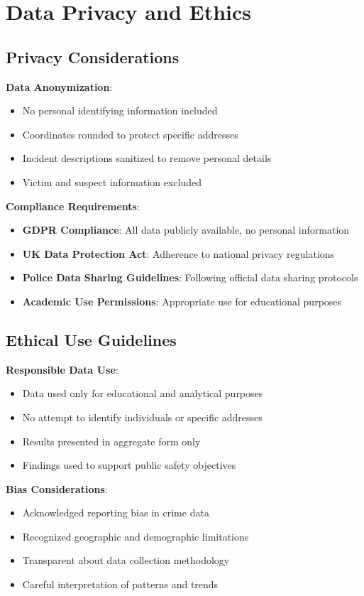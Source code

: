 \documentclass[12pt,a4paper]{article}
\begin{document}
\section{Data Privacy and Ethics}

\subsection{Privacy Considerations}

\textbf{Data Anonymization}:
\begin{itemize}
    \item No personal identifying information included
    \item Coordinates rounded to protect specific addresses
    \item Incident descriptions sanitized to remove personal details
    \item Victim and suspect information excluded
\end{itemize}

\textbf{Compliance Requirements}:
\begin{itemize}
    \item \textbf{GDPR Compliance}: All data publicly available, no personal information
    \item \textbf{UK Data Protection Act}: Adherence to national privacy regulations
    \item \textbf{Police Data Sharing Guidelines}: Following official data sharing protocols
    \item \textbf{Academic Use Permissions}: Appropriate use for educational purposes
\end{itemize}

\subsection{Ethical Use Guidelines}

\textbf{Responsible Data Use}:
\begin{itemize}
    \item Data used only for educational and analytical purposes
    \item No attempt to identify individuals or specific addresses
    \item Results presented in aggregate form only
    \item Findings used to support public safety objectives
\end{itemize}

\textbf{Bias Considerations}:
\begin{itemize}
    \item Acknowledged reporting bias in crime data
    \item Recognized geographic and demographic limitations
    \item Transparent about data collection methodology
    \item Careful interpretation of patterns and trends
\end{itemize}
\end{document}
